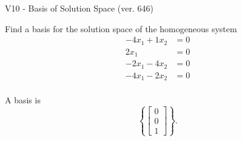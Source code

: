 \begin{exercise}
  \begin{exerciseTitle}V10 - Basis of Solution Space (ver. 646)\end{exerciseTitle}
  \begin{exerciseStatement}
    Find a basis for the solution space of the homogeneous system 
\begin{align*}
 -4 x_ 1 + 1 x_ 2 &= 0  \\ 
  2 x_ 1 &= 0  \\ 
  -2 x_ 1 -4 x_ 2 &= 0  \\ 
  -4 x_ 1 -2 x_ 2 &= 0  \\ 
 \end{align*}


 
  \end{exerciseStatement}

  \begin{exerciseAnswer}
   A basis is   
\[\left\{\left[\begin{array}{c}
0 \\
0 \\
1
\end{array}\right]\right\}.\]

  


  \end{exerciseAnswer}
\end{exercise}
